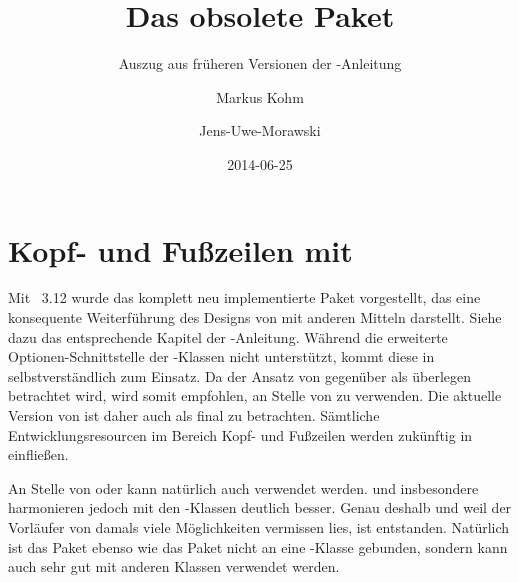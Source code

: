 
\cleardoubleoddpage

\let\savednewcommand\newcommand
\let\newcommand\renewcommand

\let\newcommand\savednewcommand
\def\theHchapter{D.\thechapter}
\setcounter{chapter}{0}
\renewcommand*{\thepage}{D.\arabic{page}}

{}

\title{Das obsolete Paket }
\subtitle{Auszug aus früheren Versionen der \KOMAScript-Anleitung}
\author{Markus Kohm\and Jens-Uwe-Morawski}
\date{2014-06-25}
\maketitle


\chapter{Kopf- und Fußzeilen mit }
%
\BeginIndexGroup
{}%
Mit \KOMAScript~3.12 wurde das komplett neu implementierte Paket
 vorgestellt, das eine konsequente Weiterführung des
Designs von  mit anderen Mitteln darstellt. Siehe dazu das
entsprechende Kapitel der \KOMAScript-Anleitung. Während
 die erweiterte Optionen-Schnittstelle der
\KOMAScript-Klassen nicht unterstützt, kommt diese in
 selbstverständlich zum Einsatz. Da der Ansatz von
 gegenüber  als überlegen
betrachtet wird, wird somit empfohlen,  an Stelle
von  zu verwenden. Die aktuelle Version von
 ist daher auch als final zu betrachten. Sämtliche
Entwicklungsresourcen im Bereich Kopf- und Fußzeilen werden zukünftig in
 einfließen.

\begin{Explain}
  An Stelle von  oder  kann
  natürlich auch  verwendet
  werden.  und insbesondere 
  harmonieren jedoch mit den \KOMAScript-Klassen deutlich besser. Genau
  deshalb und weil der Vorläufer von  damals viele
  Möglichkeiten vermissen lies, ist  entstanden. Natürlich
  ist das Paket  ebenso wie das Paket
   nicht an eine \KOMAScript-Klasse gebunden,
  sondern kann auch sehr gut mit anderen Klassen verwendet werden.
\end{Explain}


